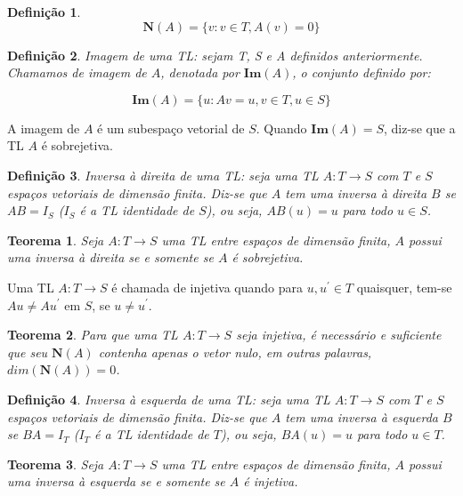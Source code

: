 \documentclass[a4paper,portuguese,9pt]{extarticle}
\newtheorem{theorem}{Teorema}[section]
\newtheorem*{definition}{Definição}
\begin{document}
\begin{multicols*}{2}
\begin{definition}
  \begin{equation*}
      \mathbf{N}(A) = \{v: v \in T, A(v)=0\}
  \end{equation*}
\end{definition}

\begin{definition}
Imagem de uma TL: sejam T, S e A definidos anteriormente. Chamamos de imagem de $A$, denotada por $\mathbf{Im}(A)$, o conjunto definido por:

      \begin{equation*}
      \mathbf{Im}(A) = \{u: Av = u, v \in T, u \in S\}
  \end{equation*}

\end{definition}

A imagem de $A$ é um subespaço vetorial de $S$. Quando $\mathbf{Im}(A)=S$, diz-se que a TL $A$ é sobrejetiva.

\begin{definition}
Inversa à direita de uma TL: seja uma TL $A:T \rightarrow S$ com $T$ e $S$ espaços vetoriais de dimensão finita. Diz-se que $A$ tem uma inversa à direita $B$ se $AB=I_S$ ($I_S$ é a TL identidade de $S$), ou seja, $AB(u)=u$ para todo $u \in S$.
\end{definition}

\begin{theorem}
Seja $A:T \rightarrow S$ uma TL entre espaços de dimensão finita, $A$ possui uma inversa à direita se e somente se $A$ é sobrejetiva.
\end{theorem}

Uma TL $A:T \rightarrow S$ é chamada de injetiva quando para $u,u^\prime
\in T$ quaisquer, tem-se $Au \ne Au^\prime$ em $S$, se $u \ne u^\prime$.

\begin{theorem}
Para que uma TL $A:T \rightarrow S$ seja injetiva, é necessário e suficiente que seu $\mathbf{N}(A)$ contenha apenas o vetor nulo, em outras palavras, $dim(\mathbf{N}(A)) = 0$.
\end{theorem}

\begin{definition}
Inversa à esquerda de uma TL: seja uma TL $A:T \rightarrow S$ com $T$ e $S$ espaços vetoriais de dimensão finita. Diz-se que $A$ tem uma inversa à esquerda $B$ se $BA=I_T$ ($I_T$ é a TL identidade de $T$), ou seja, $BA(u)=u$ para todo $u \in T$.
\end{definition}

\begin{theorem}
Seja $A:T \rightarrow S$ uma TL entre espaços de dimensão finita, $A$ possui
    uma inversa à esquerda se e somente se $A$ é injetiva.
\end{theorem}


\end{multicols*}
\end{document}
